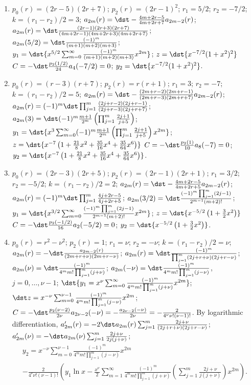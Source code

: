 \documentclass[openany]{book}
\newenvironment{sectionSolutions}{
 \begin{enumerate}[item-label={\thesection.\arabic{enumi}.}]
}{
 \end{enumerate}
}
\begin{document}
\begin{sectionSolutions}
\item
$p_0(r)=(2r-5)(2r+7)$;
$p_2(r)=(2r-1)^2$;
$r_1=5/2$; $r_2=-7/2$; $k=(r_1-r_2)/2=3$;
$a_{2m}(r)=\dst-\frac{4m+2r-5}{4m+2r+7}a_{2m-2}(r)$;
 $a_{2m}(r)=\dst
\frac{(2r-1)(2r+3)(2r+7)}{(4m+2r-1)(4m+2r+3)(4m+2r+7)}$;
$a_{2m}(5/2)=\dst\frac{(-1)^m}{(m+1)(m+2)(m+3)}$;
$y_1=\dst{x^{5/2}\sum_{m=0}^\infty\frac{(-1)^m}{(m+1)(m+2)(m+3)}x^{2m}}$;
$z=\dst{x^{-7/2}(1+x^2)^2}$
$C=-\dst\frac{p_2(1/2)}{24}a_4(-7/2)=0$;
$y_2=\dst{x^{-7/2}(1+x^2)^2}$.


\item
$p_0(r)=(r-3)(r+7)$;
$p_2(r)=r(r+1)$;
$r_1=3$; $r_2=-7$; $k=(r_1-r_2)/2=5$;
$a_{2m}(r)=\dst-\frac{(2m+r-2)(2m+r-1)}{(2m+r-3)(2m+r+7)}
a_{2m-2}(r)$;
$a_{2m}(r)=(-1)^m\dst\prod_{j=1}^m\frac{(2j+r-2)(2j+r-1)}{(2j+r-3)(2j+r+7)}$;
$a_{2m}(3)=\dst (-1)^m\frac{m+1}{2^m}\left(\prod_{j=1}^m\frac{2j+1}{
j+5}\right)$;
$y_1=\dst{x^3\sum_{m=0}^\infty(-1)^m\frac{m+1}{2^m}\left(\prod_{j=1}^m\frac{2j+1}{
j+5}\right)x^{2m}}$;
$z=\dst{x^{-7}\left(1+\frac{21}{8}x^2+\frac{35}{16}x^4+\frac{35}{64}x^6\right)}$
$C=-\dst\frac{p_2(1)}{10}a_8(-7)=0$;
$y_2=\dst{x^{-7}\left(1+\frac{21}{8}x^2+\frac{35}{16}x^4+\frac{35}{64}x^6\right)}$.


\item
$p_0(r)=(2r-3)(2r+5)$;
$p_2(r)=(2r-1)(2r+1)$;
$r_1=3/2$; $r_2=-5/2$; $k=(r_1-r_2)/2=2$;
$a_{2m}(r)=\dst-\frac{4m+2r-5}{4m+2r+5}
a_{2m-2}(r)$;
 $a_{2m}(r)=(-1)^m\dst\prod_{j=1}^m\frac{4j+2r-5}{4j+2r+5}$;
$a_{2m}(3/2)=\dst\frac{(-1)^m \prod_{j=1}^m(2j-1)}{2^{m-1}(m+2)!}$;
$y_1=\dst{x^{3/2}\sum_{m=0}^\infty\frac{(-1)^m
\prod_{j=1}^m(2j-1)}{2^{m-1}(m+2)!}x^{2m}}$;
$z=\dst{x^{-5/2}\left(1+\frac{3}{2}x^2\right)}$
$C=-\dst\frac{p_2(-1/2)}{16}a_2(-5/2)=0$;
$y_2=\dst{x^{-5/2}\left(1+\frac{3}{2}x^2\right)}$.


\item $p_0(r)=r^2-\nu^2$; $p_2(r)=1$; $r_1=\nu$;
$r_2=-\nu$; $k=(r_1-r_2)/2=\nu$;
$a_{2m}(r)=-\dst\frac{a_{2m-2}(r)}{(2m+r+\nu)(2m+r-\nu)}$;
$a_{2m}(r)=\dst\frac{(-1)^m}{\prod_{j=1}^m(2j+r+\nu)(2j+r-\nu)}$;
$a_{2m}(\nu)=\dst\frac{(-1)^m}{4^mm!\prod_{j=1}^m(j+\nu)}$;
$a_{2m}(-\nu)=\dst\frac{(-1)^m}{4^mm!\prod_{j=1}^m(j-\nu)}$,
$j=0,\dots,\nu-1$; $\dst{y_1=x^\nu\sum_{m=0}^\infty\frac{(-1)^m}{4^mm!
\prod_{j=1}^m(j+\nu)}x^{2m}}$; $\dst
z=x^{-\nu}\sum_{m=0}^{\nu-1}\frac{(-1)^m}{4^mm!
\prod_{j=1}^m(j-\nu)}x^{2m}$; $C=-\dst\frac{p_2(\nu-2)}{
2\nu}a_{2\nu-2}(-\nu)= -\frac{a_{2\nu-2}(-\nu)}{ 2\nu}=
-\frac{2}{4^\nu\nu!(\nu-1)!}$. By logarithmic differentiation,
$a_{2m}'(r)=-2\dst
a_{2m}(r)\sum_{j=1}^m\frac{2j+\nu}{(2j+r+\nu)(2j+r-\nu)}$;
$a_{2m}'(\nu)=-\dst a_{2m}(\nu)\sum_{j=1}^m\frac{2j+\nu}{2j(j+\nu)}$;
\begin{multline*}
y_2=x^{-\nu}\sum_{m=0}^{\nu-1}\frac{(-1)^m}{4^mm!\prod_{j=1}^m(j-\nu)}x^{2m}\\
-\frac{2}{4^\nu\nu!(\nu-1)!}\left(y_1 \ln x-\frac{x^\nu}{2}
\sum_{m=1}^\infty\frac{(-1)^m}{4^mm!\prod_{j=1}^m(j+\nu)}
\left(\sum_{j=1}^m\frac{2j+\nu}{ j(j+\nu)}\right) x^{2m}\right).
\end{multline*}




\end{sectionSolutions}
\end{document}
